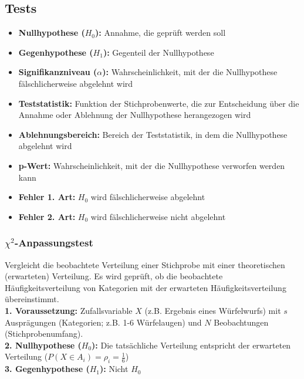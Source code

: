\subsection{Tests}

\begin{itemize}
    \item \textbf{Nullhypothese (\(H_0\)):} Annahme, die geprüft werden soll
    \item \textbf{Gegenhypothese (\(H_1\)):} Gegenteil der Nullhypothese
    \item \textbf{Signifikanzniveau (\(\alpha\)):} Wahrscheinlichkeit, mit der die Nullhypothese fälschlicherweise abgelehnt wird
    \item \textbf{Teststatistik:} Funktion der Stichprobenwerte, die zur Entscheidung über die Annahme oder Ablehnung der Nullhypothese herangezogen wird
    \item \textbf{Ablehnungsbereich:} Bereich der Teststatistik, in dem die Nullhypothese abgelehnt wird
    \item \textbf{p-Wert:} Wahrscheinlichkeit, mit der die Nullhypothese verworfen werden kann
    \item \textbf{Fehler 1. Art:} \(H_0\) wird fälschlicherweise abgelehnt
    \item \textbf{Fehler 2. Art:} \(H_0\) wird fälschlicherweise nicht abgelehnt
\end{itemize}


\subsubsection{\(\chi^2\)-Anpassungstest}

Vergleicht die beobachtete Verteilung einer Stichprobe mit 
einer theoretischen (erwarteten) Verteilung. Es wird geprüft, 
ob die beobachtete Häufigkeitsverteilung von Kategorien mit der 
erwarteten Häufigkeitsverteilung übereinstimmt.\\

\textbf{1. Voraussetzung:} Zufallsvariable \(X\) (z.B. Ergebnis eines Würfelwurfs) mit \(s\) Ausprägungen 
(Kategorien; z.B. 1-6 Würfelaugen) und \(N\) Beobachtungen (Stichprobenumfang).\\

\textbf{2. Nullhypothese (\(H_0\)):} Die tatsächliche Verteilung entspricht der erwarteten Verteilung (\(P(X \in A_i)=\rho_i=\frac{1}{6}\))\\

\textbf{3. Gegenhypothese (\(H_1\)):} Nicht \(H_0\)\\

